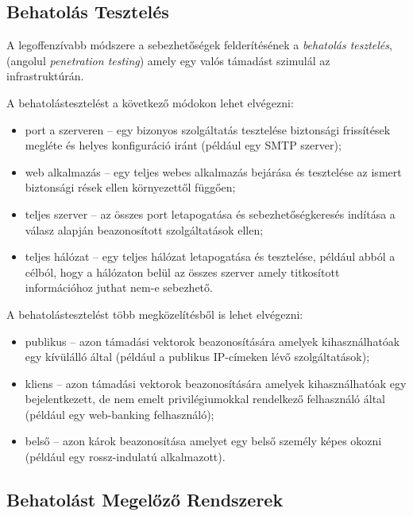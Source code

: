 \documentclass[a4paper,12pt]{article}
\begin{document}
\subsection{Behatolás Tesztelés}
	
	A legoffenzívabb módszere a sebezhetőségek felderítésének a \textit{behatolás tesztelés}, (angolul \textit{penetration testing}) amely egy valós támadást szimulál az infrastruktúrán.
	
	\noindent A behatolástesztelést a következő módokon lehet elvégezni:
	
	\begin{itemize}
		\item port a szerveren -- egy bizonyos szolgáltatás tesztelése biztonsági frissítések megléte és helyes konfiguráció iránt (például egy SMTP szerver);
		\item web alkalmazás -- egy teljes webes alkalmazás bejárása és tesztelése az ismert biztonsági rések ellen környezettől függően;
		\item teljes szerver -- az összes port letapogatása és sebezhetőségkeresés indítása a válasz alapján beazonosított szolgáltatások ellen;
		\item teljes hálózat -- egy teljes hálózat letapogatása és tesztelése, például abból a célból, hogy a hálózaton belül az összes szerver amely titkosított információhoz juthat nem-e sebezhető.
	\end{itemize}
	
	\noindent A behatolástesztelést több megközelítésből is lehet elvégezni:
	
	\begin{itemize}
		\item publikus -- azon támadási vektorok beazonosítására amelyek kihasználhatóak egy kívülálló által (például a publikus IP-címeken lévő szolgáltatások);
		\item kliens -- azon támadási vektorok beazonosítására amelyek kihasználhatóak egy bejelentkezett, de nem emelt privilégiumokkal rendelkező felhasználó által (például egy web-banking felhasználó);
		\item belső -- azon károk beazonosítása amelyet egy belső személy képes okozni (például egy rossz-indulatú alkalmazott).
	\end{itemize}

\subsection{Behatolást Megelőző Rendszerek}
	
\end{document}

